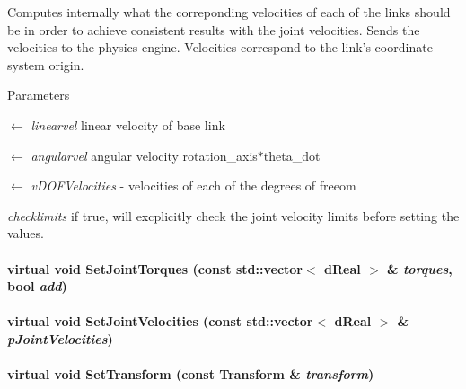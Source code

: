 Computes internally what the correponding velocities of each of the links should be in order to achieve consistent results with the joint velocities. Sends the velocities to the physics engine. Velocities correspond to the link's coordinate system origin. 
\begin{DoxyParams}{Parameters}
\item[\mbox{$\leftarrow$} {\em linearvel}]linear velocity of base link \item[\mbox{$\leftarrow$} {\em angularvel}]angular velocity rotation\_\-axis$\ast$theta\_\-dot \item[\mbox{$\leftarrow$} {\em vDOFVelocities}]-\/ velocities of each of the degrees of freeom \item[{\em checklimits}]if true, will excplicitly check the joint velocity limits before setting the values. \end{DoxyParams}
\hypertarget{classOpenRAVE_1_1KinBody_aba8aaffd5d9bb4c604eb29a0250bd525}{
\paragraph[{SetJointTorques}]{\setlength{\rightskip}{0pt plus 5cm}virtual void SetJointTorques (const std::vector$<$ dReal $>$ \& {\em torques}, \/  bool {\em add})}\hfill}
\label{classOpenRAVE_1_1KinBody_aba8aaffd5d9bb4c604eb29a0250bd525}
\hypertarget{classOpenRAVE_1_1KinBody_ad1f632c1fc4e293b7fd1482c732dd7d2}{
\paragraph[{SetJointVelocities}]{\setlength{\rightskip}{0pt plus 5cm}virtual void SetJointVelocities (const std::vector$<$ dReal $>$ \& {\em pJointVelocities})}\hfill}
\label{classOpenRAVE_1_1KinBody_ad1f632c1fc4e293b7fd1482c732dd7d2}
\hypertarget{classOpenRAVE_1_1KinBody_a92abef33e0bc4eca1756178c31e18645}{
\paragraph[{SetTransform}]{\setlength{\rightskip}{0pt plus 5cm}virtual void SetTransform (const Transform \& {\em transform})}\hfill}
\label{classOpenRAVE_1_1KinBody_a92abef33e0bc4eca1756178c31e18645}



